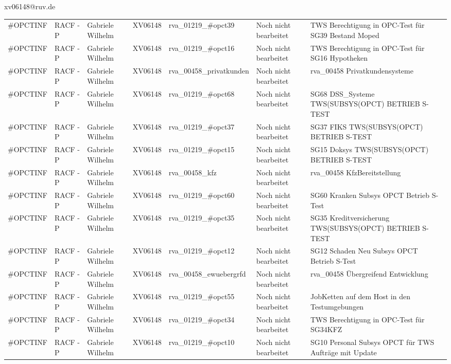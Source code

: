 \documentclass[a4paper,landscape,12pt]{letter}
\begin{document}
\begin{letter}{xv06148@ruv.de\hfill \break}
\begin{tiny}
\begin{longtable}{|p{35mm}|p{15mm}|p{25mm}|p{10mm}|p{40mm}|p{50mm}|p{50mm}|}
\#OPCTINF & RACF - P & Gabriele Wilhelm & XV06148 & rva\_01219\_\#opct39 & Noch nicht bearbeitet & TWS Berechtigung in OPC-Test für SG39 Bestand Moped \\
\#OPCTINF & RACF - P & Gabriele Wilhelm & XV06148 & rva\_01219\_\#opct16 & Noch nicht bearbeitet & TWS Berechtigung in OPC-Test für SG16 Hypotheken \\
\#OPCTINF & RACF - P & Gabriele Wilhelm & XV06148 & rva\_00458\_privatkunden & Noch nicht bearbeitet & rva\_00458 Privatkundensysteme \\
\#OPCTINF & RACF - P & Gabriele Wilhelm & XV06148 & rva\_01219\_\#opct68 & Noch nicht bearbeitet & SG68 DSS\_Systeme TWS(SUBSYS(OPCT) BETRIEB S-TEST \\
\#OPCTINF & RACF - P & Gabriele Wilhelm & XV06148 & rva\_01219\_\#opct37 & Noch nicht bearbeitet & SG37 FIKS TWS(SUBSYS(OPCT) BETRIEB S-TEST \\
\#OPCTINF & RACF - P & Gabriele Wilhelm & XV06148 & rva\_01219\_\#opct15 & Noch nicht bearbeitet & SG15 Doksys TWS(SUBSYS(OPCT) BETRIEB S-TEST \\
\#OPCTINF & RACF - P & Gabriele Wilhelm & XV06148 & rva\_00458\_kfz & Noch nicht bearbeitet & rva\_00458 KfzBereitstellung \\
\#OPCTINF & RACF - P & Gabriele Wilhelm & XV06148 & rva\_01219\_\#opct60 & Noch nicht bearbeitet & SG60 Kranken Subsys OPCT Betrieb S-Test \\
\#OPCTINF & RACF - P & Gabriele Wilhelm & XV06148 & rva\_01219\_\#opct35 & Noch nicht bearbeitet & SG35 Kreditversicherung TWS(SUBSYS(OPCT) BETRIEB S-TEST \\
\#OPCTINF & RACF - P & Gabriele Wilhelm & XV06148 & rva\_01219\_\#opct12 & Noch nicht bearbeitet & SG12 Schaden Neu Subsys OPCT Betrieb S-Test \\
\#OPCTINF & RACF - P & Gabriele Wilhelm & XV06148 & rva\_00458\_ewuebergrfd & Noch nicht bearbeitet & rva\_00458 Übergreifend Entwicklung \\
\#OPCTINF & RACF - P & Gabriele Wilhelm & XV06148 & rva\_01219\_\#opct55 & Noch nicht bearbeitet & JobKetten auf dem Host in den Testumgebungen \\
\#OPCTINF & RACF - P & Gabriele Wilhelm & XV06148 & rva\_01219\_\#opct34 & Noch nicht bearbeitet & TWS Berechtigung in OPC-Test für SG34KFZ \\
\#OPCTINF & RACF - P & Gabriele Wilhelm & XV06148 & rva\_01219\_\#opct10 & Noch nicht bearbeitet & SG10 Personal Subsys OPCT für TWS Aufträge mit Update \\

\end{longtable}
\end{tiny}
\end{letter}
\end{document}
